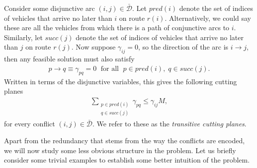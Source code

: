 \documentclass[a4paper]{article}
\theoremstyle{definition}
\theoremstyle{plain}
\begin{document}
Consider some disjunctive arc $(i,j) \in \bar{\mathcal{D}}$. Let
$\mathit{pred}(i)$ denote the set of indices of vehicles that arrive no later
than $i$ on route $r(i)$. Alternatively, we could say
these are all the vehicles from which there is a path of conjunctive arcs to
$i$. Similarly, let $\mathit{succ}(j)$ denote the set of indices of vehicles
that arrive no later than $j$ on route $r(j)$.
%
Now suppose $\gamma_{ij} = 0$, so the direction of the arc is $i \rightarrow j$,
then any feasible solution must also satisfy
\begin{align*}
  p \rightarrow q \equiv \gamma_{pq} = 0 \; \text{ for all } \; p \in \mathit{pred}(i), \; q \in \mathit{succ}(j) .
\end{align*}
Written in terms of the disjunctive variables, this gives the following cutting
planes
\begin{align*}
  \sum_{\substack{p \in \mathit{pred}(i)\\ q \in \mathit{succ}(j)}} \gamma_{pq} \leq \gamma_{ij} M ,
\end{align*}
for every conflict $(i,j) \in \bar{\mathcal{D}}$. We refer to these as
the \textit{transitive cutting planes}.


Apart from the redundancy that stems from the way the conflicts are encoded, we
will now study some less obvious structure in the problem.
%
Let us briefly consider some trivial examples to establish some better intuition
of the problem.
\end{document}

